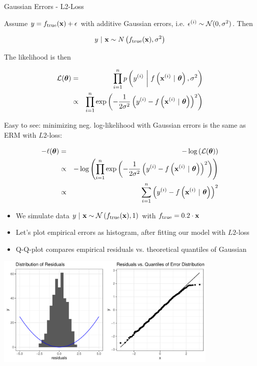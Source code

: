\documentclass[11pt,compress,t,notes=noshow, xcolor=table]{beamer}
\begin{document}
\begin{vbframe}{Gaussian Errors - L2-Loss} 

Assume $y = f_{\text{true}}(\mathbf{x}) + \epsilon$ with additive Gaussian errors, i.e. $\epsilon^{(i)} \sim \mathcal{N}(0, \sigma^2)$. Then

$$y~|~\mathbf{x} \sim N\left(f_{\text{true}}(\mathbf{x}), \sigma^2\right)$$


The likelihood is then 

\begin{eqnarray*}
\mathcal{L}(\bm{\theta}) &=& \prod\limits_{i=1}^n p\left(y^{(i)} ~\bigg|~ f\left(\mathbf{x}^{(i)} ~|~ \bm{\theta}\right), \sigma^2\right) \\ &\propto& \prod\limits_{i=1}^n \exp\left(-\frac{1}{2\sigma^2} \left(y^{(i)} - f\left(\mathbf{x}^{(i)} ~|~ \bm{\theta}\right)\right)^2\right)
\end{eqnarray*}

\framebreak 

Easy to see: minimizing neg. log-likelihood with Gaussian errors is the same as ERM with $L2$-loss:

\begin{eqnarray*}
- \ell(\bm{\theta}) &=& - \log\left(\mathcal{L}(\bm{\theta})\right) \\
&\propto& - \log\left(\prod\limits_{i=1}^n \exp\left(-\frac{1}{2\sigma^2} \left(y^{(i)} - f\left(\mathbf{x}^{(i)} ~|~ \bm{\theta}\right)\right)^2\right)\right) \\
&\propto& \sum\limits_{i=1}^n \left(y^{(i)} - f\left(\mathbf{x}^{(i)} ~|~ \bm{\theta}\right)\right)^2
\end{eqnarray*}



\framebreak 

\begin{footnotesize}
\begin{itemize}
	\item We simulate data $y ~|~\mathbf{x} \sim \mathcal{N}\left(f_{\text{true}}(\mathbf{x}), 1\right)$ with $f_{\text{true}} = 0.2 \cdot \mathbf{x}$ 
\item Let's plot empirical errors as histogram, after fitting our model with $L2$-loss
\item Q-Q-plot compares empirical residuals vs. theoretical quantiles of Gaussian 
\end{itemize}
\end{footnotesize}

\includegraphics[width = 0.8\textwidth]{figure/residuals_plot_L2.pdf}

\end{vbframe}
\end{document}
